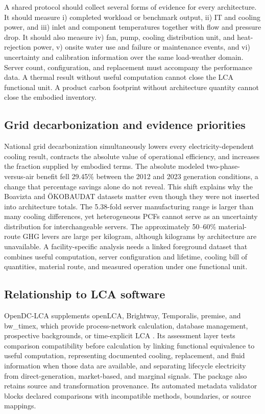 \documentclass[review,a4paper,fleqn]{cas-sc}
\begin{document}
A shared protocol should collect several forms of evidence for every architecture. It should measure i) completed workload or benchmark output, ii) IT and cooling power, and iii) inlet and component temperatures together with flow and pressure drop. It should also measure iv) fan, pump, cooling distribution unit, and heat-rejection power, v) onsite water use and failure or maintenance events, and vi) uncertainty and calibration information over the same load-weather domain. Server count, configuration, and replacement must accompany the performance data. A thermal result without useful computation cannot close the LCA functional unit. A product carbon footprint without architecture quantity cannot close the embodied inventory.

\subsection{Grid decarbonization and evidence priorities}
National grid decarbonization simultaneously lowers every electricity-dependent cooling result, contracts the absolute value of operational efficiency, and increases the fraction supplied by embodied terms. The absolute modeled two-phase-versus-air benefit fell 29.45\% between the 2012 and 2023 generation conditions, a change that percentage savings alone do not reveal. This shift explains why the Boavizta and ÖKOBAUDAT datasets matter even though they were not inserted into architecture totals. The 5.38-fold server manufacturing range is larger than many cooling differences, yet heterogeneous PCFs cannot serve as an uncertainty distribution for interchangeable servers. The approximately 50--60\% material-route GHG levers are large per kilogram, although kilograms by architecture are unavailable. A facility-specific analysis needs a linked foreground dataset that combines useful computation, server configuration and lifetime, cooling bill of quantities, material route, and measured operation under one functional unit.

\subsection{Relationship to LCA software}
OpenDC-LCA supplements openLCA, Brightway, Temporalis, premise, and bw\_timex, which provide process-network calculation, database management, prospective backgrounds, or time-explicit LCA \cite{ref27,ref28,ref29,ref37,ref38}. Its assessment layer tests comparison compatibility before calculation by linking functional equivalence to useful computation, representing documented cooling, replacement, and fluid information when those data are available, and separating lifecycle electricity from direct-generation, market-based, and marginal signals. The package also retains source and transformation provenance. Its automated metadata validator blocks declared comparisons with incompatible methods, boundaries, or source mappings.
\end{document}
